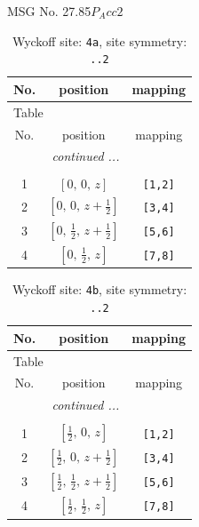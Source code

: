 \documentclass[fleqn,8pt]{jsarticle}
\begin{document}
\setcounter{MaxMatrixCols}{32}

\renewcommand{\tablename}{Table~}
\renewcommand{\figurename}{Figure~}
\begin{center}
\LARGE
MSG No. 27.85\quad$P_{A}cc2$
\end{center}
\renewcommand{\arraystretch}{1.2}
\begin{longtable}{ccc}
\caption{Wyckoff site: {\tt 4a}, site symmetry: {\tt ..2}}
 \\
 \hline \hline
No. & position & mapping \\ \hline \endfirsthead

\multicolumn{2}{l}{\tablename\ \thetable{}} \\
 \hline \hline
No. & position & mapping \\ \hline \endhead

 \hline \hline
\multicolumn{2}{r}{\footnotesize\it continued ...} \\ \endfoot

 \hline \hline
\multicolumn{2}{r}{} \\ \endlastfoot

1 & $\left[ 0,\, 0,\, z \right]$ & {\tt [1,2]} \\ \hline
2 & $\left[ 0,\, 0,\, z + \frac{1}{2} \right]$ & {\tt [3,4]} \\ \hline
3 & $\left[ 0,\, \frac{1}{2},\, z + \frac{1}{2} \right]$ & {\tt [5,6]} \\ \hline
4 & $\left[ 0,\, \frac{1}{2},\, z \right]$ & {\tt [7,8]} \\
\end{longtable}
\renewcommand{\arraystretch}{1.2}
\begin{longtable}{ccc}
\caption{Wyckoff site: {\tt 4b}, site symmetry: {\tt ..2}}
 \\
 \hline \hline
No. & position & mapping \\ \hline \endfirsthead

\multicolumn{2}{l}{\tablename\ \thetable{}} \\
 \hline \hline
No. & position & mapping \\ \hline \endhead

 \hline \hline
\multicolumn{2}{r}{\footnotesize\it continued ...} \\ \endfoot

 \hline \hline
\multicolumn{2}{r}{} \\ \endlastfoot

1 & $\left[ \frac{1}{2},\, 0,\, z \right]$ & {\tt [1,2]} \\ \hline
2 & $\left[ \frac{1}{2},\, 0,\, z + \frac{1}{2} \right]$ & {\tt [3,4]} \\ \hline
3 & $\left[ \frac{1}{2},\, \frac{1}{2},\, z + \frac{1}{2} \right]$ & {\tt [5,6]} \\ \hline
4 & $\left[ \frac{1}{2},\, \frac{1}{2},\, z \right]$ & {\tt [7,8]} \\
\end{longtable}
\end{document}
